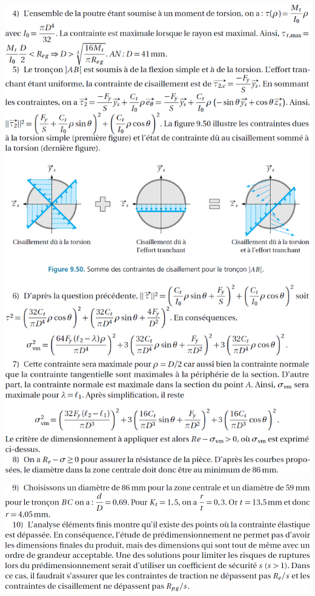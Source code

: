\documentclass[10pt,fleqn]{article} %
\begin{document}
\begin{center}
\includegraphics[width=\linewidth]{images/cor_03}

\includegraphics[width=\linewidth]{images/cor_04}
\end{center}
\end{document}
